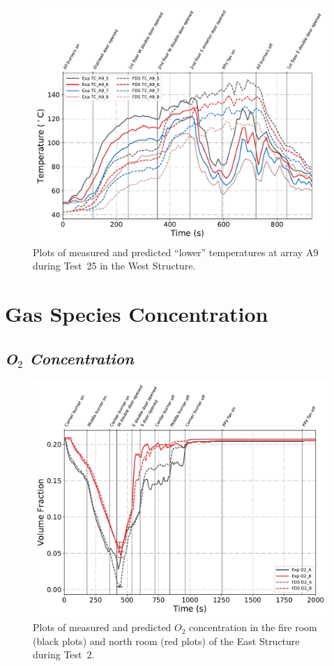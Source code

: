 \begin{figure}[!h]
	\centering
	\includegraphics[width=\columnwidth]{Figures/Plots/Validation/Temperature/Test_25_TC_A9_lower}
	\caption{Plots of measured and predicted ``lower'' temperatures at array A9 during Test~25 in the West Structure.}
	\label{fig:TCA9_lower_data_Test25}
\end{figure}

\clearpage
\section{Gas Species Concentration}
\subsection*{\textit{O$_2$ Concentration}}
\begin{figure}[!h]
	\centering
	\includegraphics[width=\columnwidth]{Figures/Plots/Validation/Gas_Concentration/Test_2_O2}
	\caption[Plots of measured and predicted $O_2$ concentration during Test~2.]{Plots of measured and predicted $O_2$ concentration in the fire room (black plots) and north room (red plots) of the East Structure during Test~2.}
	\label{fig:Test2_O2}
\end{figure}

